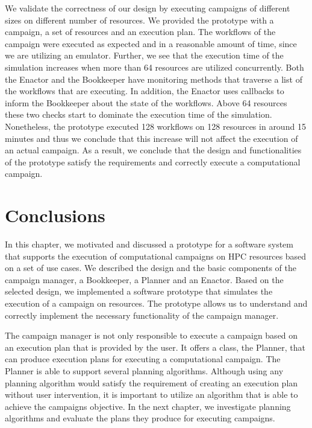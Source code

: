 We validate the correctness of our design by executing campaigns of different sizes on different number of resources.
We provided the prototype with a campaign, a set of resources and an execution plan.
The workflows of the campaign were executed as expected and in a reasonable amount of time, since we are utilizing an emulator.
Further, we see that the execution time of the simulation increases when more than 64 resources are utilized concurrently.
Both the Enactor and the Bookkeeper have monitoring methods that traverse a list of the workflows that are executing.
In addition, the Enactor uses callbacks to inform the Bookkeeper about the state of the workflows.
Above 64 resources these two checks start to dominate the execution time of the simulation.
Nonetheless, the prototype executed 128 workflows on 128 resources in around 15 minutes and thus we conclude that this increase will not affect the execution of an actual campaign.
As a result, we conclude that the design and functionalities of the prototype satisfy the requirements and correctly execute a computational campaign.


\section{Conclusions}
\label{sec:cm_concl}
In this chapter, we motivated and discussed a prototype for a software system that supports the execution of computational campaigns on HPC resources based on a set of use cases.
We described the design and the basic components of the campaign manager, a Bookkeeper, a Planner and an Enactor.
Based on the selected design, we implemented a software prototype that simulates the execution of a campaign on resources.
The prototype allows us to understand and correctly implement the necessary functionality of the campaign manager.

The campaign manager is not only responsible to execute a campaign based on an execution plan that is provided by the user.
It offers a class, the Planner, that can produce execution plans for executing a computational campaign.
The Planner is able to support several planning algorithms.
Although using any planning algorithm would satisfy the requirement of creating an execution plan without user intervention, it is important to utilize an algorithm that is able to achieve the campaigns objective.
In the next chapter, we investigate planning algorithms and evaluate the plans they produce for executing campaigns.

